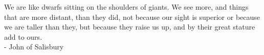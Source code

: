 \vspace*{10cm}
\centering

We are like dwarfs sitting on the shoulders of giants. We see more, and things that are more distant, than they did, not because our sight is superior or because we are taller than they, but because they raise us up, and by their great stature add to ours. \\ - John of Salisbury